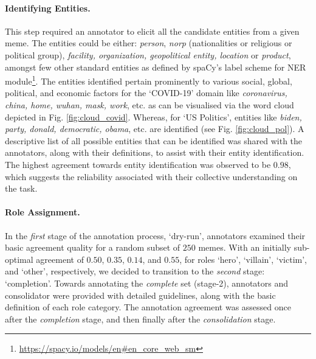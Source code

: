 \documentclass[11pt]{article}
\begin{document}

\paragraph{\bf Identifying Entities.} This step required an annotator to elicit all the candidate entities from a given meme. The entities could be either: \textit{person}, \textit{norp} (nationalities or religious or political group), \textit{facility, organization, geopolitical entity, location} or \textit{product}, amongst few other standard entities as defined by spaCy's label scheme for NER module\footnote{\url{https://spacy.io/models/en\#en_core_web_sm}}. The entities identified pertain prominently to various social, global, political, and economic factors for the `COVID-19' domain like \textit{coronavirus, china, home, wuhan, mask, work}, etc. as can be visualised via the word cloud depicted in Fig. \ref{fig:cloud_covid}. Whereas, for `US Politics', entities like \textit{biden, party, donald, democratic, obama}, etc. are identified (see Fig. \ref{fig:cloud_pol}). A descriptive list of all possible entities that can be identified was shared with the annotators, along with their definitions, to assist with their entity identification. The highest agreement towards entity identification was observed to be $0.98$, which suggests the reliability associated with their collective understanding on the task.


\paragraph{\bf Role Assignment.} In the \textit{first} stage of the annotation process, `dry-run', annotators examined their basic agreement quality for a random subset of $250$ memes. With an initially sub-optimal agreement of $0.50$, $0.35$, $0.14$, and $0.55$, for roles `hero', `villain', `victim', and `other', respectively, we decided to transition to the \textit{second} stage: `completion'. Towards annotating the \textit{complete} set (stage-2), annotators and consolidator were provided with detailed guidelines, along with the basic definition of each role category. The annotation agreement was assessed once after the \textit{completion} stage, and then finally after the \textit{consolidation} stage.
\end{document}

